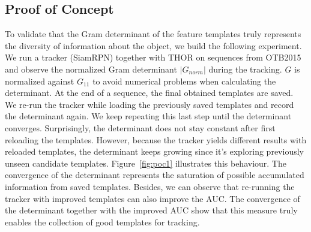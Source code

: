 \documentclass{article}
\begin{document}
\subsection{Proof of Concept} \label{sec:poc}
To validate that the Gram determinant of the feature templates truly represents the diversity of information about the object, we build the following experiment. We run a tracker (SiamRPN) together with THOR on sequences from OTB2015 and observe the normalized Gram determinant $|G_{norm}|$ during the tracking. $G$ is normalized against $G_{11}$ to avoid numerical problems when calculating the determinant. At the end of a sequence, the final obtained templates are saved. We re-run the tracker while loading the previously saved templates and record the determinant again. We keep repeating this last step until the determinant converges. Surprisingly, the determinant does not stay constant after first reloading the templates. However, because the tracker yields different results with reloaded templates, the determinant keeps growing since it's exploring previously unseen candidate templates. Figure~\ref{fig:poc1} illustrates this behaviour. The convergence of the determinant represents the saturation of possible accumulated information from saved templates. Besides, we can observe that re-running the tracker with improved templates can also improve the AUC. The convergence of the determinant together with the improved AUC show that this measure truly enables the collection of good templates for tracking.
\end{document}
